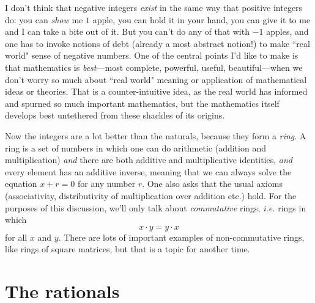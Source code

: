 \documentclass[11pt,oneside]{amsart}
\begin{document}
I don't think that negative integers {\em exist} in the same way that positive integers do: you can {\em show} me $1$ apple, you can hold it in your hand,
you can give it to me and I can take a bite out of it.  But you can't do any of that with $-1$ apples, and one has to invoke notions of debt (already a most abstract notion!) to make ``real world" sense of negative numbers. One of the central points I'd like to make is that mathematics is {\em best}---most complete, powerful, useful, beautiful---when we don't worry so much about ``real world" meaning or application of mathematical ideas or theories.  That is a counter-intuitive idea, 
as the real world has informed and spurned so much important mathematics, but the mathematics itself develops best untethered from these shackles of its origins.

Now the integers are a lot better than the naturals, because they form a {\em ring}.  A ring is a set of numbers in which one can do arithmetic
(addition and multiplication) {\em and} there are both additive and multiplicative identities, {\em and} every element has an additive inverse,
meaning that we can always solve the equation $x+r = 0$ for any number $r$.  One also asks that the usual axioms (associativity, distributivity of
multiplication over addition etc.) hold.  
For the purposes of this discussion, we'll only talk about {\em commutative} rings, 
{\em i.e.} rings in which
$$x\cdot y = y\cdot x$$
for all $x$ and $y$.  There are lots of important examples of non-commutative rings, like rings of square matrices, but that is a topic for another time.


\section{The rationals}
\end{document}
